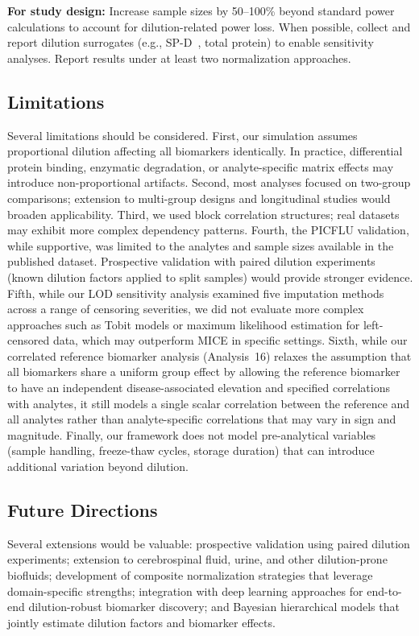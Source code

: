\documentclass[12pt]{article}
\begin{document}
\textbf{For study design:} Increase sample sizes by 50--100\% beyond standard power calculations to account for dilution-related power loss. When possible, collect and report dilution surrogates (e.g., SP-D~\cite{Haeger2024}, total protein) to enable sensitivity analyses. Report results under at least two normalization approaches.

\subsection{Limitations}

Several limitations should be considered. First, our simulation assumes proportional dilution affecting all biomarkers identically. In practice, differential protein binding, enzymatic degradation, or analyte-specific matrix effects may introduce non-proportional artifacts. Second, most analyses focused on two-group comparisons; extension to multi-group designs and longitudinal studies would broaden applicability. Third, we used block correlation structures; real datasets may exhibit more complex dependency patterns. Fourth, the PICFLU validation, while supportive, was limited to the analytes and sample sizes available in the published dataset. Prospective validation with paired dilution experiments (known dilution factors applied to split samples) would provide stronger evidence. Fifth, while our LOD sensitivity analysis examined five imputation methods across a range of censoring severities, we did not evaluate more complex approaches such as Tobit models or maximum likelihood estimation for left-censored data, which may outperform MICE in specific settings. Sixth, while our correlated reference biomarker analysis (Analysis~16) relaxes the assumption that all biomarkers share a uniform group effect by allowing the reference biomarker to have an independent disease-associated elevation and specified correlations with analytes, it still models a single scalar correlation between the reference and all analytes rather than analyte-specific correlations that may vary in sign and magnitude. Finally, our framework does not model pre-analytical variables (sample handling, freeze-thaw cycles, storage duration) that can introduce additional variation beyond dilution.

\subsection{Future Directions}

Several extensions would be valuable: prospective validation using paired dilution experiments; extension to cerebrospinal fluid, urine, and other dilution-prone biofluids; development of composite normalization strategies that leverage domain-specific strengths; integration with deep learning approaches for end-to-end dilution-robust biomarker discovery; and Bayesian hierarchical models that jointly estimate dilution factors and biomarker effects.
\end{document}
